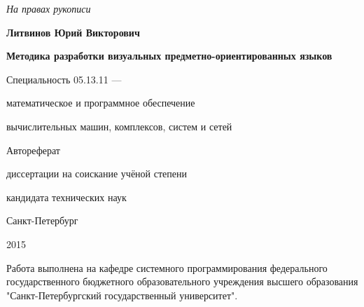 \newcommand{\sfs}{\fontsize{10pt}{10pt}\selectfont}
\sfs %
\thispagestyle{empty}

\vspace{10mm}
\begin{flushright}
  \Large\textit{На правах рукописи}
\end{flushright}

\vspace{25mm}
\begin{center}
  \Large\bf{Литвинов Юрий Викторович}
\end{center}

\vspace{20mm}
\begin{center}
  {\bf \LARGE Методика разработки визуальных предметно-ориентированных языков
\par}

\vspace{20mm}
{\Large
Специальность 05.13.11 ---\par
математическое и программное обеспечение\par
вычислительных машин, комплексов, систем и сетей
}

\vspace{15mm}
\LARGE Автореферат\par
\Large{диссертации на соискание учёной степени\par
кандидата технических наук}
\end{center}

\vspace{35mm}
\begin{center}
  \Large{Санкт-Петербург\par 2015}
\end{center}

\newpage
\thispagestyle{empty}

\small{
Работа выполнена на кафедре системного программирования федерального государственного
бюджетного образовательного учреждения высшего образования "Санкт-Петербургский
государственный университет".
}

